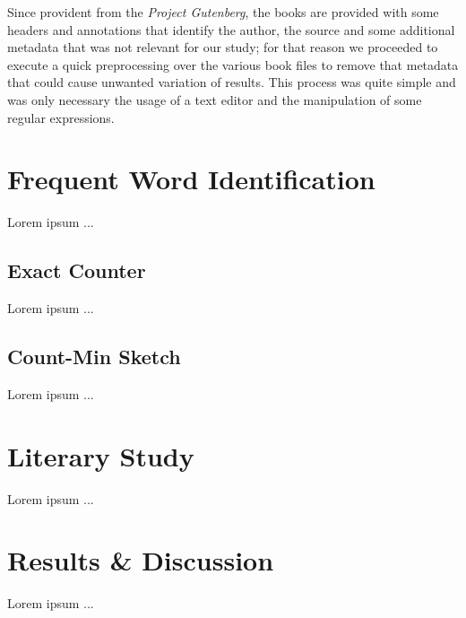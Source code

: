 \documentclass[shortpaper]{revdetua}
\begin{document}
Since provident from the \textit{Project Gutenberg}, the books are provided with some headers and annotations that identify the author, the source and some additional metadata that was not relevant for our study; for that reason we proceeded to execute a quick preprocessing over the various book files to remove that metadata that could cause unwanted variation of results. This process was quite simple and was only necessary the usage of a text editor and the manipulation of some regular expressions.


\section{Frequent Word Identification}\label{algs}

Lorem ipsum ...

\subsection{Exact Counter}

Lorem ipsum ...

\subsection{Count-Min Sketch}

Lorem ipsum ...


\section{Literary Study}

Lorem ipsum ...



\section{Results \& Discussion}

Lorem ipsum ...
\end{document}
